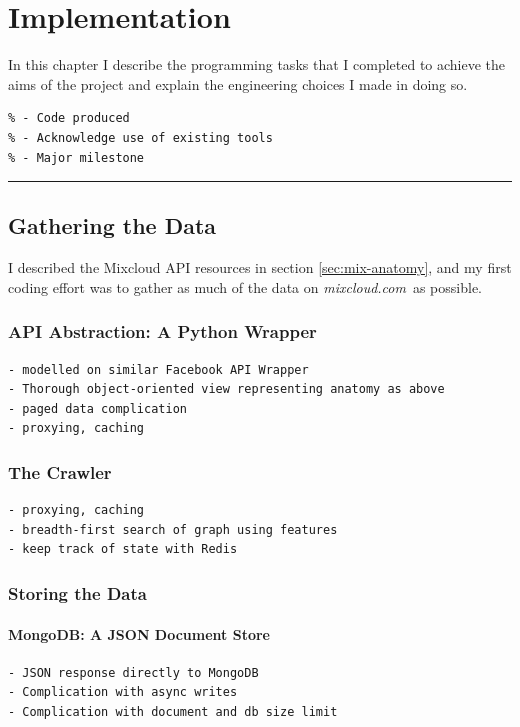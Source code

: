\documentclass[a4paper,12pt,twoside,notitlepage]{report}
\def\mixurl{\emph{mixcloud.com}}
\newcommand{\rulewidth}{300pt}
\newcommand{\halfrule}{
  \begin{center}
    {\rule{\rulewidth}{0.5pt}}
  \end{center}}
\begin{document}
\chapter{Implementation}

In this chapter I describe the programming tasks that I completed to achieve the
aims of the project and explain the engineering choices I made in doing so. 

\begin{verbatim}
% - Code produced
% - Acknowledge use of existing tools
% - Major milestone 
\end{verbatim}

\halfrule

\section{Gathering the Data}

I described the Mixcloud API resources in section \ref{sec:mix-anatomy}, and my
first coding effort was to gather as much of the data on \mixurl\ as possible.

\subsection{API Abstraction: A Python Wrapper}

\begin{verbatim}
- modelled on similar Facebook API Wrapper
- Thorough object-oriented view representing anatomy as above
- paged data complication
- proxying, caching
\end{verbatim}

\subsection{The Crawler}

\begin{verbatim}
- proxying, caching
- breadth-first search of graph using features
- keep track of state with Redis 
\end{verbatim}

\subsection{Storing the Data}

\subsubsection{MongoDB: A JSON Document Store}
\begin{verbatim}
- JSON response directly to MongoDB
- Complication with async writes
- Complication with document and db size limit
\end{verbatim}
\end{document}
